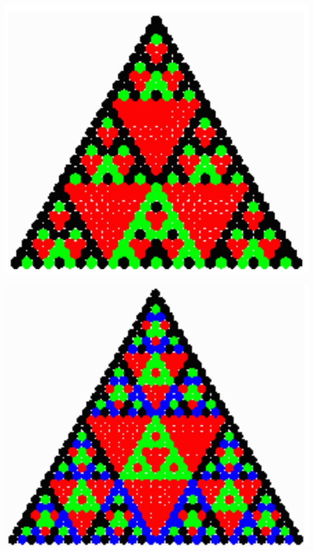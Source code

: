 \documentclass{article}
\begin{document}
\begin{center}
	\includegraphics[scale=0.35]{images/pascal3.png}
\end{center}

\begin{center}
	\includegraphics[scale=0.35]{images/pascal4.png}
\end{center}
\end{document}

